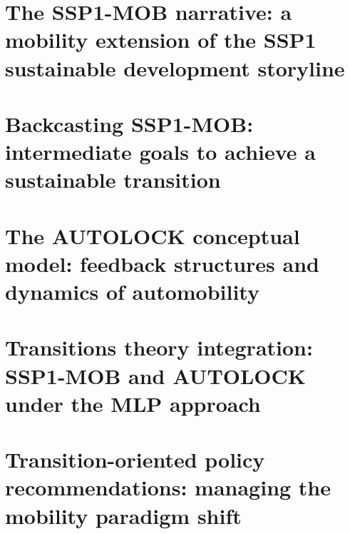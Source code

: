 \section[The SSP1-MOB narrative]{The SSP1-MOB narrative: a mobility extension of the SSP1 sustainable development storyline}
\label{s:results:ssp1-mob}


\section[Backcasting SSP1-MOB]{Backcasting SSP1-MOB: intermediate goals to achieve a sustainable transition}
\label{s:results:backcasting-ssp1-mob}


\section[The AUTOLOCK conceptual model]{The AUTOLOCK conceptual model: feedback structures and dynamics of automobility}
\label{s:results:autolock-model}


\section[Transitions theory integration]{Transitions theory integration: SSP1-MOB and AUTOLOCK under the MLP approach}
\label{s:results:characterizing-transition}


\section[Transition-oriented policy recommendations]{Transition-oriented policy recommendations: managing the mobility paradigm shift}
\label{s:results:policy-recommendations}
